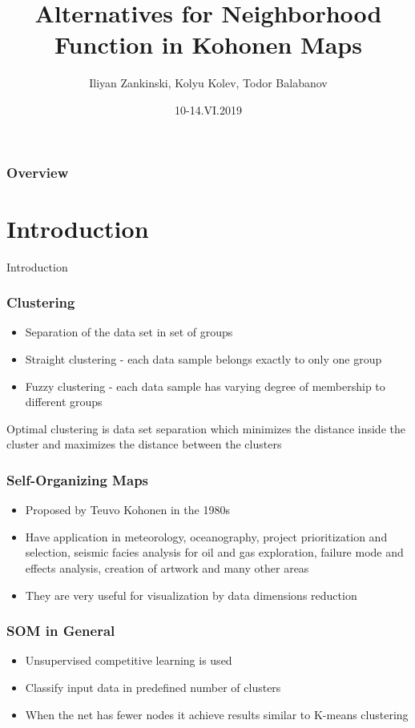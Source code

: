 \documentclass{beamer}
\title[12th International Conference on Large-Scale Scientific Computations, June 10 - 14, 2019, Sozopol, Bulgaria]{
	Alternatives for Neighborhood Function in Kohonen Maps
}
\author{Iliyan Zankinski, Kolyu Kolev, Todor Balabanov}
\date{10-14.VI.2019}
\institute[IICT-BAS, LSSC'19] {
	Institute of Information and Communication Technologies \\ 
	Bulgarian Academy of Sciences \\
	\medskip
	\textit{iliyan@hsi.iccs.bas.bg}
}
\begin{document}
\begin{frame}
\titlepage
\end{frame}

\begin{frame}
\frametitle{Overview}
\tableofcontents
\end{frame}

\section{Introduction}

\begin{frame}
\center \huge{Introduction}
\end{frame}

\begin{frame}
\frametitle{Clustering}
\begin{itemize}
  \item Separation of the data set in set of groups
  \item Straight clustering - each data sample belongs exactly to only one group
  \item Fuzzy clustering - each data sample has varying degree of membership to different groups
\end{itemize}
Optimal clustering is data set separation which minimizes the distance inside the cluster and maximizes the distance between the clusters
\end{frame}

\begin{frame}
\frametitle{Self-Organizing Maps}
\begin{itemize}
  \item Proposed by Teuvo Kohonen in the 1980s
  \item Have application in meteorology, oceanography, project prioritization and selection, seismic facies analysis for oil and gas exploration, failure mode and effects analysis, creation of artwork and many other areas
  \item They are very useful for visualization by data dimensions reduction
\end{itemize}
\end{frame}

\begin{frame}
\frametitle{SOM in General}
\begin{itemize}
  \item Unsupervised competitive learning is used
  \item Classify input data in predefined number of clusters
  \item When the net has fewer nodes it achieve results similar to K-means clustering
\end{itemize}
\end{frame}
\end{document}
